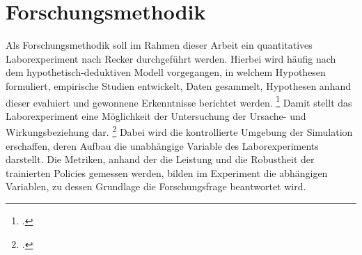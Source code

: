 \section{Forschungsmethodik}

Als Forschungsmethodik soll im Rahmen dieser Arbeit ein quantitatives Laborexperiment nach Recker \cite*[]{Recker.2021} durchgeführt werden.
Hierbei wird häufig nach dem hypothetisch-deduktiven Modell vorgegangen, in welchem Hypothesen formuliert, empirische Studien entwickelt, Daten gesammelt, Hypothesen anhand dieser evaluiert und gewonnene Erkenntnisse berichtet werden. \footcite[Vgl.][S. S.89f.]{Recker.2021}
Damit stellt das Laborexperiment eine Möglichkeit der Untersuchung der Ursache- und Wirkungsbeziehung dar. \footcite[Vgl.][S. 106]{Recker.2021}
Dabei wird die kontrollierte Umgebung der Simulation erschaffen, deren Aufbau die unabhängige Variable des Laborexperiments darstellt.
Die Metriken, anhand der die Leistung und die Robustheit der trainierten Policies gemessen werden, bilden im Experiment die abhängigen Variablen, zu dessen Grundlage die Forschungsfrage beantwortet wird.